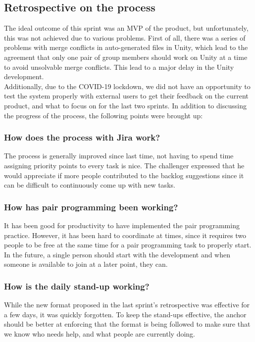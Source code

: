 \subsection{Retrospective on the process}
The ideal outcome of this sprint was an MVP of the product, but unfortunately, this was not achieved due to various problems.
First of all, there was a series of problems with merge conflicts in auto-generated files in Unity, which lead to the agreement that only one pair of group members should work on Unity at a time to avoid unsolvable merge conflicts.
This lead to a major delay in the Unity development.\\
Additionally, due to the COVID-19 lockdown, we did not have an opportunity to test the system properly with external users to get their feedback on the current product, and what to focus on for the last two sprints.
In addition to discussing the progress of the process, the following points were brought up:

\subsubsection*{How does the process with Jira work?}
The process is generally improved since last time, not having to spend time assigning priority points to every task is nice.
The challenger expressed that he would appreciate if more people contributed to the backlog suggestions since it can be difficult to continuously come up with new tasks.


\subsubsection*{How has pair programming been working?}
It has been good for productivity to have implemented the pair programming practice.
However, it has been hard to coordinate at times, since it requires two people to be free at the same time for a pair programming task to properly start.
In the future, a single person should start with the development and when someone is available to join at a later point, they can.

\subsubsection*{How is the daily stand-up working?}
While the new format proposed in the last sprint's retrospective was effective for a few days, it was quickly forgotten.
To keep the stand-ups effective, the anchor should be better at enforcing that the format is being followed to make sure that we know who needs help, and what people are currently doing.


